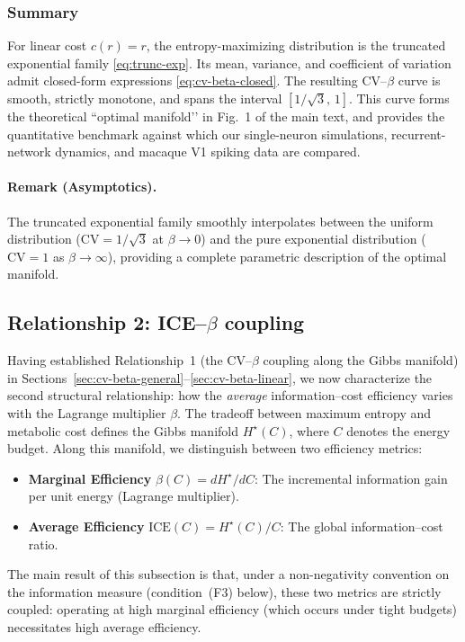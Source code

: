 \documentclass[11pt]{article}
\theoremstyle{remark}
\theoremstyle{definition}
\begin{document}
\subsubsection{Summary}

For linear cost $c(r)=r$, the entropy-maximizing distribution is the
truncated exponential family \eqref{eq:trunc-exp}.  
Its mean, variance, and coefficient of variation admit closed-form
expressions \eqref{eq:cv-beta-closed}.  
The resulting CV–$\beta$ curve is smooth, strictly monotone, and spans
the interval $[1/\sqrt{3},\,1]$.  
This curve forms the theoretical “optimal manifold’’ in Fig.~1 of the
main text, and provides the quantitative benchmark against which our
single-neuron simulations, recurrent-network dynamics, and macaque V1
spiking data are compared.

\paragraph{Remark (Asymptotics).}
The truncated exponential family smoothly interpolates between the
uniform distribution ($\mathrm{CV}=1/\sqrt{3}$ at $\beta\to 0$) and the
pure exponential distribution ($\mathrm{CV}=1$ as $\beta\to\infty$),
providing a complete parametric description of the optimal manifold.

\subsection{Relationship 2: ICE--$\beta$ coupling}
\label{sec:marginal-average-coupling}

Having established Relationship~1 (the CV--$\beta$ coupling along the Gibbs manifold) in Sections~\ref{sec:cv-beta-general}--\ref{sec:cv-beta-linear}, we now characterize the second structural relationship: how the \emph{average} information--cost efficiency varies with the Lagrange multiplier $\beta$.  The tradeoff between maximum entropy and metabolic cost defines the Gibbs manifold $H^\star(C)$, where $C$ denotes the energy budget.  Along this manifold, we distinguish between two efficiency metrics:
\begin{itemize}
    \item \textbf{Marginal Efficiency} $\beta(C) = dH^\star/dC$: The incremental information gain per unit energy (Lagrange multiplier).
    \item \textbf{Average Efficiency} $\mathrm{ICE}(C) = H^\star(C)/C$: The global information--cost ratio.
\end{itemize}
The main result of this subsection is that, under a non-negativity convention on the information measure (condition~(F3) below), these two metrics are strictly coupled: operating at high marginal efficiency (which occurs under tight budgets) necessitates high average efficiency.
\end{document}
